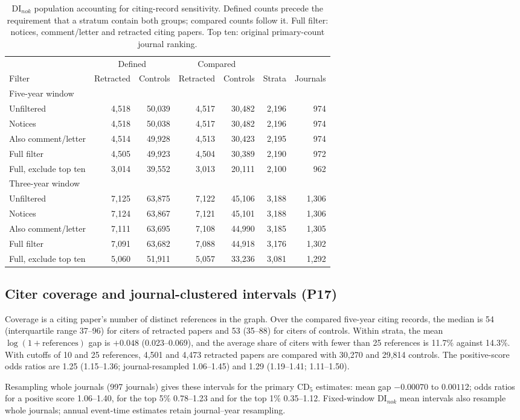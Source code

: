 \begin{table}[!htbp]
\centering
\caption{DI$_{nok}$ population accounting for citing-record sensitivity. Defined counts precede the requirement
that a stratum contain both groups; compared counts follow it. Full filter: notices, comment/letter and retracted
citing papers. Top ten: original primary-count journal ranking.}
\label{tab:citercounts}
\small
\setlength{\tabcolsep}{3pt}
\begin{tabular}{@{}lrrrrrr@{}}
\toprule
 & \multicolumn{2}{c}{Defined} & \multicolumn{2}{c}{Compared} & & \\
Filter & Retracted & Controls & Retracted & Controls & Strata & Journals \\
\midrule
\multicolumn{7}{l}{Five-year window} \\
Unfiltered & 4,518 & 50,039 & 4,517 & 30,482 & 2,196 & 974 \\
Notices & 4,518 & 50,038 & 4,517 & 30,482 & 2,196 & 974 \\
Also comment/letter & 4,514 & 49,928 & 4,513 & 30,423 & 2,195 & 974 \\
Full filter & 4,505 & 49,923 & 4,504 & 30,389 & 2,190 & 972 \\
Full, exclude top ten & 3,014 & 39,552 & 3,013 & 20,111 & 2,100 & 962 \\
\midrule
\multicolumn{7}{l}{Three-year window} \\
Unfiltered & 7,125 & 63,875 & 7,122 & 45,106 & 3,188 & 1,306 \\
Notices & 7,124 & 63,867 & 7,121 & 45,101 & 3,188 & 1,306 \\
Also comment/letter & 7,111 & 63,695 & 7,108 & 44,990 & 3,185 & 1,305 \\
Full filter & 7,091 & 63,682 & 7,088 & 44,918 & 3,176 & 1,302 \\
Full, exclude top ten & 5,060 & 51,911 & 5,057 & 33,236 & 3,081 & 1,292 \\
\bottomrule
\end{tabular}
\end{table}
\subsection{Citer coverage and journal-clustered intervals (P17)}
Coverage is a citing paper's number of distinct references in the graph. Over the compared five-year citing records,
the median is 54 (interquartile range 37--96) for citers of retracted papers and 53 (35--88) for citers of controls.
Within strata, the mean $\log(1+\text{references})$ gap is $+0.048$ (0.023--0.069), and the average share of citers
with fewer than 25 references is 11.7\% against 14.3\%. With cutoffs of 10 and 25 references, 4,501 and 4,473
retracted papers are compared with 30,270 and 29,814 controls. The positive-score odds ratios are 1.25 (1.15--1.36;
journal-resampled 1.06--1.45) and 1.29 (1.19--1.41; 1.11--1.50).

Resampling whole journals (997 journals) gives these intervals for the primary CD$_5$ estimates: mean gap
$-0.00070$ to $0.00112$; odds ratios for a positive score 1.06--1.40, for the top 5\% 0.78--1.23 and for the
top 1\% 0.35--1.12. Fixed-window DI$_{nok}$ mean intervals also resample whole journals; annual event-time
estimates retain journal--year resampling.
\FloatBarrier
